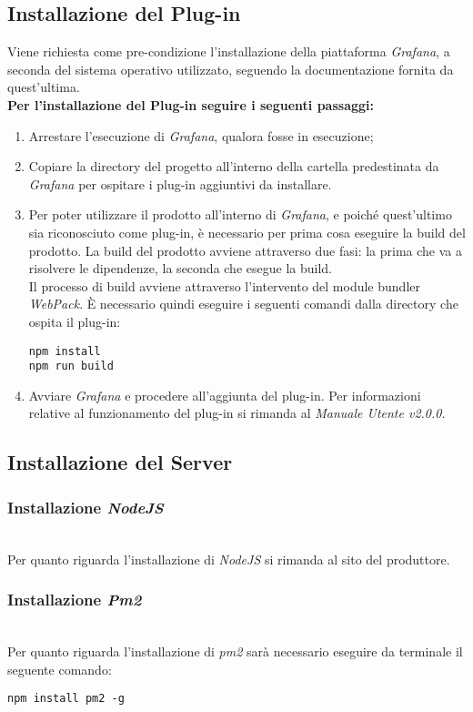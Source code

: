 \subsection{Installazione del Plug-in}
Viene richiesta come pre-condizione l'installazione della piattaforma \textit{Grafana}, a seconda del sistema operativo utilizzato, seguendo la documentazione fornita da quest'ultima.\\
\textbf{Per l'installazione del Plug-in seguire i seguenti passaggi:}
\begin{enumerate}
	\item Arrestare l'esecuzione di \textit{Grafana}, qualora fosse in esecuzione;	
	\item Copiare la directory del progetto all'interno della cartella predestinata da \textit{Grafana} per ospitare i plug-in aggiuntivi da installare.
	\item Per poter utilizzare il prodotto all'interno di \textit{Grafana}, e poiché quest'ultimo sia riconosciuto come plug-in, è necessario per prima cosa eseguire la build del prodotto.
	La build del prodotto avviene attraverso due fasi: la prima che va a risolvere le dipendenze, la seconda che esegue la build.\\
	Il processo di build avviene attraverso l'intervento del module bundler \textit{WebPack}\glossario.
	È necessario quindi eseguire i seguenti comandi dalla directory che ospita il plug-in:
\begin{center}
	\texttt{npm install}\\
	\texttt{npm run build}
\end{center}
\item Avviare \textit{Grafana} e procedere all'aggiunta del plug-in.
Per informazioni relative al funzionamento del plug-in si rimanda al \textit{Manuale Utente v2.0.0}.
\end{enumerate}

\subsection{Installazione del Server}\label{installazione_server}
\subsubsection{Installazione \textit{NodeJS}}\-\\
Per quanto riguarda l'installazione di \textit{NodeJS} si rimanda al sito del produttore.

\subsubsection{Installazione \textit{Pm2}}\-\\
Per quanto riguarda l'installazione di \textit{pm2} sarà necessario eseguire da terminale il seguente comando:
\begin{center}
	\texttt{npm install pm2 -g}
\end{center}
	
